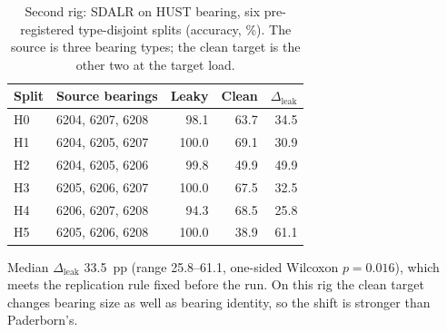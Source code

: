 \begin{table}[htbp]
\centering
\caption{Second rig: SDALR on HUST bearing, six pre-registered type-disjoint splits (accuracy, \%). The source is three bearing types; the clean target is the other two at the target load.}
\label{tab:hust}
\begin{tabular}{llrrr}
\toprule
Split & Source bearings & Leaky & Clean & $\Delta_{\mathrm{leak}}$ \\
\midrule
H0 & 6204, 6207, 6208 & 98.1 & 63.7 & 34.5 \\
H1 & 6204, 6205, 6207 & 100.0 & 69.1 & 30.9 \\
H2 & 6204, 6205, 6206 & 99.8 & 49.9 & 49.9 \\
H3 & 6205, 6206, 6207 & 100.0 & 67.5 & 32.5 \\
H4 & 6206, 6207, 6208 & 94.3 & 68.5 & 25.8 \\
H5 & 6205, 6206, 6208 & 100.0 & 38.9 & 61.1 \\
\bottomrule
\end{tabular}
\begin{minipage}{\linewidth}\vspace{2pt}\footnotesize Median $\Delta_{\mathrm{leak}}$ 33.5~pp (range 25.8--61.1, one-sided Wilcoxon $p=0.016$), which meets the replication rule fixed before the run. On this rig the clean target changes bearing size as well as bearing identity, so the shift is stronger than Paderborn's.\end{minipage}
\end{table}
